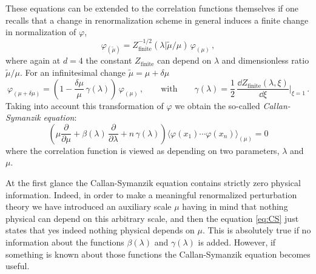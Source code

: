 These equations can be extended to the correlation functions themselves if one
recalls that a change in renormalization scheme in general induces a finite
change in normalization of $\varphi$,
\[
\varphi_{(\tilde\mu)}=Z^{-1/2}_{\text{finite}}(\lambda|\tilde\mu/\mu)\,\varphi_{(\mu)}\,,
\]
where again at $d=4$ the constant $Z_{\text{finite}}$ can depend on $\lambda$ and
dimensionless ratio $\tilde\mu/\mu$. For an infinitesimal change
$\tilde\mu=\mu+\delta\mu$
\[
\varphi_{(\mu+\delta\mu)}=\left(1-\frac{\delta\mu}\mu\,\gamma(\lambda)\right)\,\varphi_{(\mu)}\,,
\qquad\text{with}\qquad
\gamma(\lambda)=\frac12\,\frac{\dd Z_{\text{finite}}(\lambda,\xi)}{\dd\xi}\Big|_{\xi=1}\,.
\]
Taking into account this transformation of $\varphi$ we obtain the so-called
\emph{Callan-Symanzik equation}:
\begin{equation}\label{eq:CS}
\left(\mu\frac\partial{\partial\mu}+\beta(\lambda)\,\frac\partial{\partial\lambda}+n\,\gamma(\lambda)\right)\bigl\langle\varphi(x_1)\cdots\varphi(x_n)\bigr\rangle_{(\mu)}=0
\end{equation}
where the correlation function is viewed as depending on two parameters,
$\lambda$ and $\mu$.

At the first glance the Callan-Symanzik equation contains strictly zero physical
information. Indeed, in order to make a meaningful renormalized perturbation
theory we have introduced an auxiliary scale $\mu$ having in mind that nothing
physical can depend on this arbitrary scale, and then the equation \eqref{eq:CS}
just states that yes indeed nothing physical depends on $\mu$. This is
absolutely true if no information about the functions $\beta(\lambda)$ and
$\gamma(\lambda)$ is added. However, if something is known about those functions
the Callan-Symanzik equation becomes useful.

